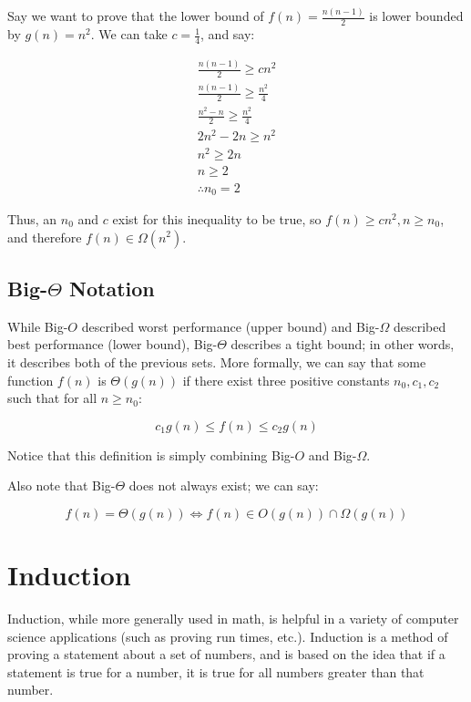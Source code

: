 \documentclass[12pt]{article}
\begin{document}
Say we want to prove that the lower bound of $f(n) = \frac{n(n-1)}{2}$ is lower bounded by $g(n) = n^2$. We can take $c=\frac{1}{4}$, and say:

\begin{equation}
    \begin{split}
        \frac{n(n-1)}{2} \geq cn^2\\
        \frac{n(n-1)}{2} \geq \frac{n^2}{4}\\
        \frac{n^2-n}{2} \geq \frac{n^2}{4}\\
        2n^2-2n \geq n^2\\
        n^2 \geq 2n\\
        n \geq 2\\
        \therefore n_0 = 2
    \end{split}
\end{equation}

Thus, an $n_0$ and $c$ exist for this inequality to be true, so $f(n) \geq cn^2, n \geq n_0$, and therefore $f(n) \in \Omega(n^2)$.

\subsection{\texorpdfstring{Big-$\Theta$ Notation}{TEXT}}

While Big-$O$ described worst performance (upper bound) and Big-$\Omega$ described best performance (lower bound), Big-$\Theta$ describes a tight bound; in other words, it describes both of the previous sets. More formally, we can say that some function $f(n)$ is $\Theta(g(n))$ if there exist three positive constants $n_0, c_1, c_2$ such that for all $n\geq n_0$:

\begin{equation}
    c_1g(n) \leq f(n) \leq c_2g(n)
\end{equation}

Notice that this definition is simply combining Big-$O$ and Big-$\Omega$.

Also note that Big-$\Theta$ does not always exist; we can say:

\begin{equation}
    f(n) = \Theta(g(n)) \iff f(n) \in O(g(n)) \cap \Omega(g(n))
\end{equation}

\section{Induction}

Induction, while more generally used in math, is helpful in a variety of computer science applications (such as proving run times, etc.). Induction is a method of proving a statement about a set of numbers, and is based on the idea that if a statement is true for a number, it is true for all numbers greater than that number.
\end{document}
